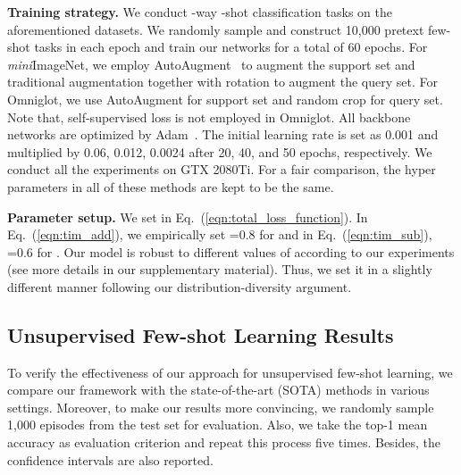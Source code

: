 \documentclass[letterpaper]{article} \usepackage{aaai21}  \usepackage{times}  \usepackage{helvet} \usepackage{courier}  \usepackage[hyphens]{url}  \usepackage{graphicx} \urlstyle{rm} \def\UrlFont{\rm}  \usepackage{natbib}  \usepackage{caption} \usepackage{url}
\begin{document}
\noindent\textbf{Training strategy.}
We conduct -way -shot classification tasks on the aforementioned datasets. We randomly sample and construct 10,000 pretext few-shot tasks in each epoch and train our networks for a total of 60 epochs. For \emph{mini}ImageNet, we employ AutoAugment~\cite{Cubuk2019CVPR} to augment the support set and traditional augmentation together with rotation to augment the query set. For Omniglot, we use AutoAugment for support set and random crop for query set. Note that, self-supervised loss is not employed in Omniglot. All backbone networks are optimized by Adam~\cite{Kingma2014Adam}. The initial learning rate is set as 0.001 and multiplied by 0.06, 0.012, 0.0024 after 20, 40, and 50 epochs, respectively. We conduct all the experiments on GTX 2080Ti. For a fair comparison, the hyper parameters in all of these methods are kept to be the same.

\noindent\textbf{Parameter setup.} We set  in Eq.~(\ref{eqn:total_loss_function}). In Eq.~(\ref{eqn:tim_add}), we empirically set =0.8 for  and in Eq.~(\ref{eqn:tim_sub}), =0.6 for . Our model is robust to different values of  according to our experiments (see more details in our supplementary material). Thus, we set it in a slightly different manner following our distribution-diversity argument.


\subsection{Unsupervised Few-shot Learning Results}
To verify the effectiveness of our approach for unsupervised few-shot learning, we compare our framework with the state-of-the-art (SOTA) methods in various settings. Moreover, to make our results more convincing, we randomly sample 1,000 episodes from the test set for evaluation. Also, we take the top-1 mean accuracy as evaluation criterion and repeat this process five times. Besides, the  confidence intervals are also reported.

\iffalse
\begin{figure*}[tbp]
	\centering
	\begin{minipage}{.4\linewidth}
		\centering
		\texttt{[image: figs/com\_sep.pdf]}
        \vspace{-0.2cm}
		\caption{Comparison between composite augmentation and diverse augmentation on \emph{mini}ImageNet.}
		\label{fig:com_sep}
	\end{minipage}
    \quad
	\begin{minipage}{.47\linewidth}
		\centering
		\texttt{[image: figs/KL\_FID.pdf]}
        \vspace{-0.4cm}
		\caption{The performance changing with the value of distribution divergence on \emph{mini}ImageNet.}
		\label{fig:distribution_difference}
	\end{minipage}
\end{figure*}
\fi
\end{document}
